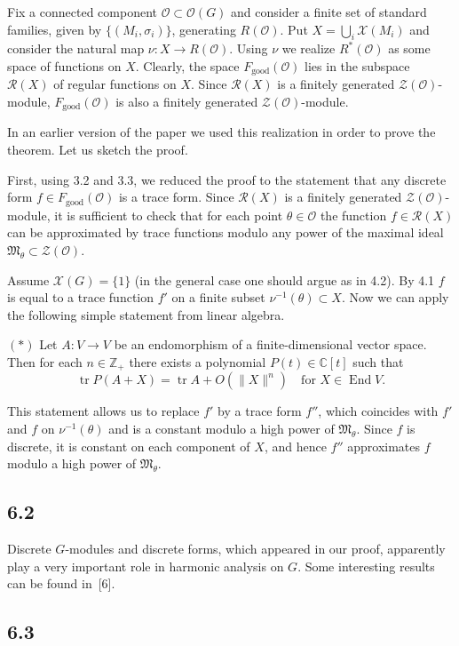 \documentclass[12pt,a4paper]{article}
\theoremstyle{plain}
\theoremstyle{definition}
\theoremstyle{remark}
\DeclareMathOperator{\tr}{tr}
\DeclareMathOperator{\End}{End}
\newcommand{\cO}{\mathcal{O}}
\newcommand{\cR}{\mathcal{R}}
\newcommand{\cZ}{\mathcal{Z}}
\newcommand{\cX}{\mathcal{X}}
\newcommand{\fM}{\mathfrak{M}}
\newcommand{\bC}{\mathbb{C}}
\newcommand{\bZ}{\mathbb{Z}}
\begin{document}
Fix a connected component $\cO \subset \cO(G)$ and consider a finite set of standard families, given by $\{(M_i, \sigma_i)\}$, generating $R(\cO)$. Put $X = \bigcup_i \cX(M_i)$ and consider the natural map $\nu: X \to R(\cO)$. Using $\nu$ we realize $R^*(\cO)$ as some space of functions on $X$. Clearly, the space $F_{\text{good}}(\cO)$ lies in the subspace $\cR(X)$ of regular functions on $X$. Since $\cR(X)$ is a finitely generated $\cZ(\cO)$-module, $F_{\text{good}}(\cO)$ is also a finitely generated $\cZ(\cO)$-module.

In an earlier version of the paper we used this realization in order to prove the theorem. Let us sketch the proof.

First, using 3.2 and 3.3, we reduced the proof to the statement that any discrete form $f \in F_{\text{good}}(\cO)$ is a trace form. Since $\cR(X)$ is a finitely generated $\cZ(\cO)$-module, it is sufficient to check that for each point $\theta \in \cO$ the function $f \in \cR(X)$ can be approximated by trace functions modulo any power of the maximal ideal $\fM_\theta \subset \cZ(\cO)$.

Assume $\cX(G) = \{1\}$ (in the general case one should argue as in 4.2). By 4.1 $f$ is equal to a trace function $f'$ on a finite subset $\nu^{-1}(\theta) \subset X$. Now we can apply the following simple statement from linear algebra.

$(*)$ Let $A: V \to V$ be an endomorphism of a finite-dimensional vector space. Then for each $n \in \bZ_+$ there exists a polynomial $P(t) \in \bC[t]$ such that
\[
\tr P(A + X) = \tr A + O(\|X\|^n) \quad \text{for } X \in \End V.
\]

This statement allows us to replace $f'$ by a trace form $f''$, which coincides with $f'$ and $f$ on $\nu^{-1}(\theta)$ and is a constant modulo a high power of $\fM_\theta$. Since $f$ is discrete, it is constant on each component of $X$, and hence $f''$ approximates $f$ modulo a high power of $\fM_\theta$.

\subsection*{6.2}

Discrete $G$-modules and discrete forms, which appeared in our proof, apparently play a very important role in harmonic analysis on $G$. Some interesting results can be found in~[6].

\subsection*{6.3}
\end{document}

